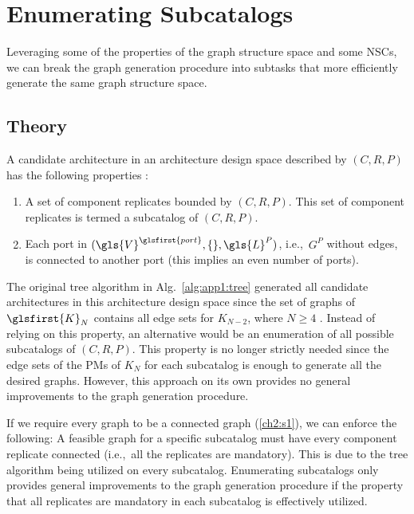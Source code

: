 \section{Enumerating Subcatalogs\label{sec:app1:subcatalogs}}

Leveraging some of the properties of the graph structure space and some NSCs, we can break the graph generation procedure into subtasks that more efficiently generate the same graph structure space.

\subsection{Theory}

A candidate architecture in an architecture design space described by $(C,R,P)$ has the following properties \cite{Herber2017a}:
\begin{enumerate}
\item A set of component replicates bounded by $(C,R,P)$. This set of component replicates is termed a subcatalog of $(C,R,P)$.

\item  Each port in $(\gls{V}^{\glsfirst{port}},\{\},\gls{L}^P)$, i.e.,~$G^P$ without edges, is connected to another port (this implies an even number of ports).
\end{enumerate} 

The original tree algorithm in Alg.~\ref{alg:app1:tree} generated all candidate architectures in this architecture design space since the set of  graphs of $\glsfirst{K}_N$ contains all edge sets for $K_{N-2}$, where $N \geq 4$ \cite{Herber2017a}.
Instead of relying on this property, an alternative would be an enumeration of all possible subcatalogs of $(C,R,P)$.
This property is no longer strictly needed since the edge sets of the PMs of $K_N$ for each subcatalog is enough to generate all the desired graphs.
However, this approach on its own provides no general improvements to the graph generation procedure.

If we require every graph to be a connected graph (\ref{ch2:s1}), we can enforce the following: A feasible graph for a specific subcatalog must have every component replicate connected (i.e.,~all the replicates are mandatory).
This is due to the tree algorithm being utilized on every subcatalog. 
Enumerating subcatalogs only provides general improvements to the graph generation procedure if the property that all replicates are mandatory in each subcatalog is effectively utilized.

